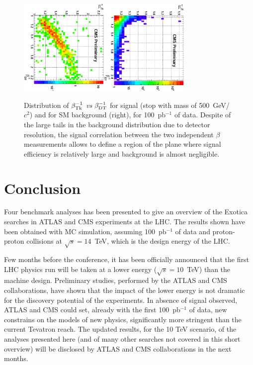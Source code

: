 \documentclass{cimento}
\begin{document}
\begin{figure}[htbp] 
\centering
\includegraphics[angle=90,width=0.38\textwidth]{betaHSCPSig.eps}\includegraphics[angle=90,width=0.38\textwidth]{betaHSCPBkg.eps}  
\caption{Distribution of $\beta_{{\rm Tk}}^{-1}$ {\it vs} $\beta_{{\rm DT}}^{-1}$  
for signal (stop with mass of 500~GeV/$c^2$) and for SM background (right), 
for 100~pb$^{-1}$ of data. Despite of the large tails in the background distribution due 
to detector resolution, the signal correlation between the two independent 
$\beta$ measurements allows to define a region of the plane where signal efficiency is 
relatively large and background is almost negligible.}
\label{fig:HSCPSigBkgPlots}
\end{figure}

\section{Conclusion} \label{Conclusion}
Four benchmark analyses has been presented to give an
overview of the Exotica searches in ATLAS and CMS 
experiments at the LHC. The results shown have been obtained with 
MC simulation, assuming 100~pb$^{-1}$ of data and proton-proton collisions
at $\sqrt{s} = 14$~TeV, which is the design energy of the LHC.


Few months before the conference, it has been officially announced 
that the first LHC physics run will be taken at a lower energy 
($\sqrt{s} = 10$~TeV) than the machine design. Preliminary 
studies, performed by the ATLAS and CMS collaborations, 
have shown that the impact of the lower energy is not dramatic for the 
discovery potential of the experiments. In absence of signal observed,
ATLAS and CMS could set, already with the first 100~pb$^{-1}$ of data, 
new constrains on the models of new physics,  significantly more stringent 
than the current Tevatron reach. The updated results,
for the 10 TeV scenario, of the analyses presented here 
(and of many other searches not covered in this short overview) 
will be disclosed by ATLAS and CMS collaborations 
in the next months.
\end{document}
